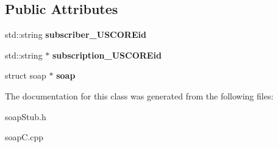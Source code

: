 \subsection*{Public Attributes}
\begin{DoxyCompactItemize}
\item 
\hypertarget{class__pass____unsubscribe_ae4c8ae81f028a617c9e56cdfb3ed065e}{
std::string {\bfseries subscriber\_\-USCOREid}}
\label{class__pass____unsubscribe_ae4c8ae81f028a617c9e56cdfb3ed065e}

\item 
\hypertarget{class__pass____unsubscribe_a0cd32dd8be35c07cb3709d4ca1ba592b}{
std::string $\ast$ {\bfseries subscription\_\-USCOREid}}
\label{class__pass____unsubscribe_a0cd32dd8be35c07cb3709d4ca1ba592b}

\item 
\hypertarget{class__pass____unsubscribe_a313db074e00687ced73aa9e18e8a34bf}{
struct soap $\ast$ {\bfseries soap}}
\label{class__pass____unsubscribe_a313db074e00687ced73aa9e18e8a34bf}

\end{DoxyCompactItemize}


The documentation for this class was generated from the following files:\begin{DoxyCompactItemize}
\item 
soapStub.h\item 
soapC.cpp\end{DoxyCompactItemize}
